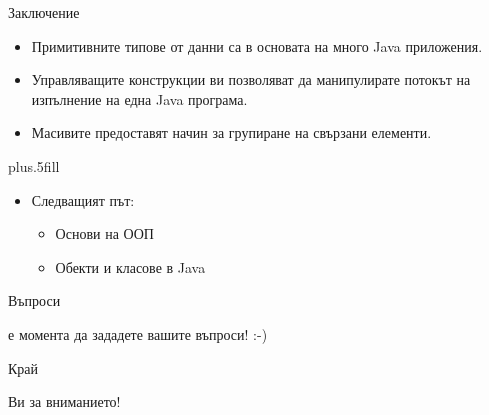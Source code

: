 \documentclass{beamer}
\begin{document}
\begin{frame}{Заключение}
  \transdissolve
  \begin{itemize}
  \item
    Примитивните типове от данни са в основата на много Java приложения.
  \item
    Управляващите конструкции ви позволяват да манипулирате потокът на
    изпълнение на една Java програма.
  \item
    Масивите предоставят начин за групиране на свързани елементи.
  \end{itemize}
  
  \vskip0pt plus.5fill
  \begin{itemize}
  \item
    Следващият път:
    \begin{itemize}
    \item
      Основи на ООП
    \item
      Обекти и класове в Java
    \end{itemize}
  \end{itemize}
\end{frame}


\begin{frame}{Въпроси}
  \transdissolve
  \begin{center}
     е момента да зададете вашите въпроси! :-)
  \end{center}
\end{frame}


\begin{frame}{Край}
  \transdissolve
  \begin{center}
     Ви за вниманието!
  \end{center}
  
\end{frame}
\end{document}

